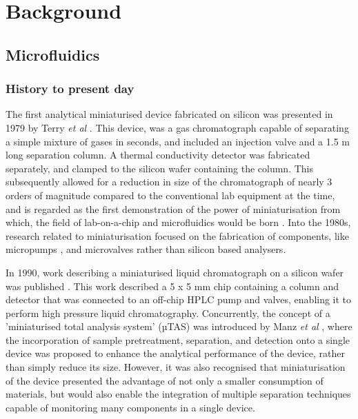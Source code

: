 
\chapter{Background}\label{Background}

\section{Microfluidics}

\subsection{History to present day}

The first analytical miniaturised device fabricated on silicon was presented in 1979 by Terry \textit{et al}
\citep{terry1979ieee}. This device, was a gas chromatograph capable of separating a simple mixture of gases
in seconds, and included an injection valve and a 1.5 m long separation column. A thermal conductivity detector
was fabricated separately, and clamped to the silicon wafer containing the column. This subsequently allowed for
a reduction in size of the chromatograph of nearly 3 orders of magnitude compared to the conventional lab equipment at the time,
and is regarded as the first demonstration of the power of miniaturisation from which, the
field of lab-on-a-chip and microfluidics would be born \citep{reyes2002micro}.
Into the 1980s, research related to miniaturisation focused on the fabrication of
components, like micropumps \citep{van1988piezoelectric,van1989thermo}, and microvalves \citep{shoji1988prototype}
rather than silicon based analysers.

In 1990, work describing a miniaturised liquid chromatograph on a silicon
wafer was published \citep{manz1990design}. This work described a 5 x 5 mm chip containing a
column and detector that was connected to an off-chip HPLC pump and valves, enabling it to perform high pressure
liquid chromatography. Concurrently, the concept of a 'miniaturised total analysis system' (µTAS) was introduced
by Manz \textit{et al} \citep{manz1990miniaturized}, where the incorporation of sample pretreatment, separation,
and detection onto a single device was proposed to enhance the analytical performance of the device, rather
than simply reduce its size. However, it was also recognised that miniaturisation of the device
presented the advantage of not only a smaller consumption of materials, but would also
enable the integration of multiple separation techniques capable of monitoring many components in a single device.

